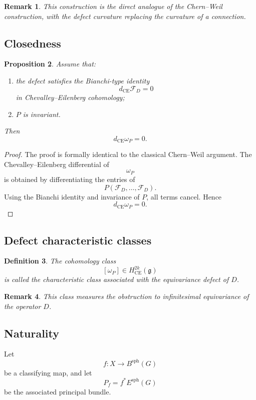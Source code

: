 \documentclass[11pt]{amsart}
\newtheorem{definition}{Definition}[section]
\newtheorem{proposition}[definition]{Proposition}
\newtheorem{remark}[definition]{Remark}
\begin{document}
\begin{remark}
This construction is the direct analogue of the Chern--Weil construction,
with the defect curvature replacing the curvature of a connection.
\end{remark}

\subsection{Closedness}

\begin{proposition}
Assume that:
\begin{enumerate}
\item the defect satisfies the Bianchi-type identity
\[
d_{\mathrm{CE}}\mathcal F_D=0
\]
in Chevalley--Eilenberg cohomology;
\item \(P\) is invariant.
\end{enumerate}
Then
\[
d_{\mathrm{CE}}\omega_P=0.
\]
\end{proposition}

\begin{proof}
The proof is formally identical to the classical Chern--Weil argument.
The Chevalley--Eilenberg differential of
\[
\omega_P
\]
is obtained by differentiating the entries of
\[
P(\mathcal F_D,\ldots,\mathcal F_D).
\]
Using the Bianchi identity and invariance of \(P\), all terms cancel.
Hence
\[
d_{\mathrm{CE}}\omega_P=0.
\]
\end{proof}

\subsection{Defect characteristic classes}

\begin{definition}
The cohomology class
\[
[\omega_P]
\in
H^{2k}_{\mathrm{CE}}(\mathfrak g)
\]
is called the \emph{characteristic class associated with the equivariance
defect of \(D\)}.
\end{definition}

\begin{remark}
This class measures the obstruction to infinitesimal equivariance of the
operator \(D\).
\end{remark}

\subsection{Naturality}

Let
\[
f:X\to B^{\mathrm{sph}}(G)
\]
be a classifying map, and let
\[
P_f=f^*E^{\mathrm{sph}}(G)
\]
be the associated principal bundle.
\end{document}

